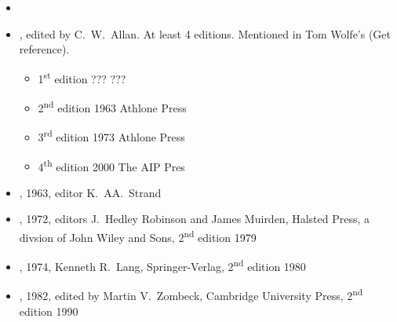 \documentclass{article}
\begin{document}
\begin{itemize}
\item {}
  
\item {}, edited by C.\ W.\ Allan. At least 4 editions. Mentioned in Tom Wolfe's  (Get reference).
  \begin{itemize}
  \item 1\textsuperscript{st} edition ??? ???
  \item 2\textsuperscript{nd} edition 1963 Athlone Press
  \item 3\textsuperscript{rd} edition 1973 Athlone Press
  \item 4\textsuperscript{th} edition 2000 The AIP Pres
  \end{itemize}

\item {}, 1963, editor K.\ AA.\ Strand

\item {}, 1972, editors J.\ Hedley Robinson and James Muirden, Halsted Press, a divsion of John Wiley and Sons, 2\textsuperscript{nd} edition 1979

\item {}, 1974, Kenneth R.\ Lang, Springer-Verlag, 2\textsuperscript{nd} edition 1980

\item {}, 1982, edited by Martin V.\ Zombeck, Cambridge University Press, 2\textsuperscript{nd} edition 1990
  
\end{itemize}
\end{document}
